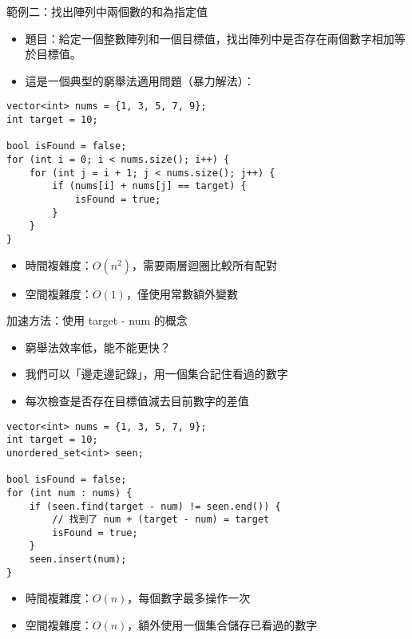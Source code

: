 \documentclass{beamer}
\begin{document}
\begin{frame}[fragile]{範例二：找出陣列中兩個數的和為指定值}
\begin{itemize}
    \item 題目：給定一個整數陣列和一個目標值，找出陣列中是否存在兩個數字相加等於目標值。
    \item 這是一個典型的窮舉法適用問題（暴力解法）：
\end{itemize}

\vspace{0.5em}
\begin{lstlisting}[style=cppstyle]
vector<int> nums = {1, 3, 5, 7, 9};
int target = 10;

bool isFound = false;
for (int i = 0; i < nums.size(); i++) {
    for (int j = i + 1; j < nums.size(); j++) {
        if (nums[i] + nums[j] == target) {
            isFound = true;
        }
    }
}
\end{lstlisting}

\vspace{0.5em}
\begin{itemize}
    \item 時間複雜度：$O(n^2)$，需要兩層迴圈比較所有配對
    \item 空間複雜度：$O(1)$，僅使用常數額外變數
\end{itemize}
\end{frame}

\begin{frame}[fragile]{加速方法：使用 target - num 的概念}
\begin{itemize}
    \item 窮舉法效率低，能不能更快？
    \item 我們可以「邊走邊記錄」，用一個集合記住看過的數字
    \item 每次檢查是否存在目標值減去目前數字的差值
\end{itemize}

\vspace{0.5em}
\begin{lstlisting}[style=cppstyle]
vector<int> nums = {1, 3, 5, 7, 9};
int target = 10;
unordered_set<int> seen;

bool isFound = false;
for (int num : nums) {
    if (seen.find(target - num) != seen.end()) {
        // 找到了 num + (target - num) = target
        isFound = true;
    }
    seen.insert(num);
}
\end{lstlisting}

\vspace{0.5em}
\begin{itemize}
    \item 時間複雜度：$O(n)$，每個數字最多操作一次
    \item 空間複雜度：$O(n)$，額外使用一個集合儲存已看過的數字
\end{itemize}
\end{frame}
\end{document}
